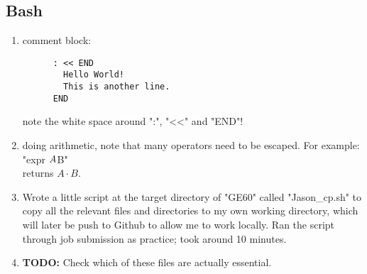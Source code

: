 \documentclass[12pt,letterpaper]{article}
\begin{document}
\subsection{Bash}
\begin{enumerate}
  \item comment block:
    \begin{verbatim}
      : << END
        Hello World!
        This is another line.
      END
    \end{verbatim}
    note the white space around ":", "<<" and "END"!

  \item doing arithmetic, note that many operators need to be escaped. For example:\\
    "expr $A \* $B"\\
    returns $A\cdot B$.
    
  \item Wrote a little script at the target directory of "GE60" called 
    "Jason_cp.sh" to copy all the relevant files and directories to my
    own working directory, which will later be push to Github to allow
    me to work locally. Ran the script through job submission as practice;
    took around 10 minutes.
  \item \textbf{TODO:} Check which of these files are actually essential.
\end{enumerate}
\end{document}
